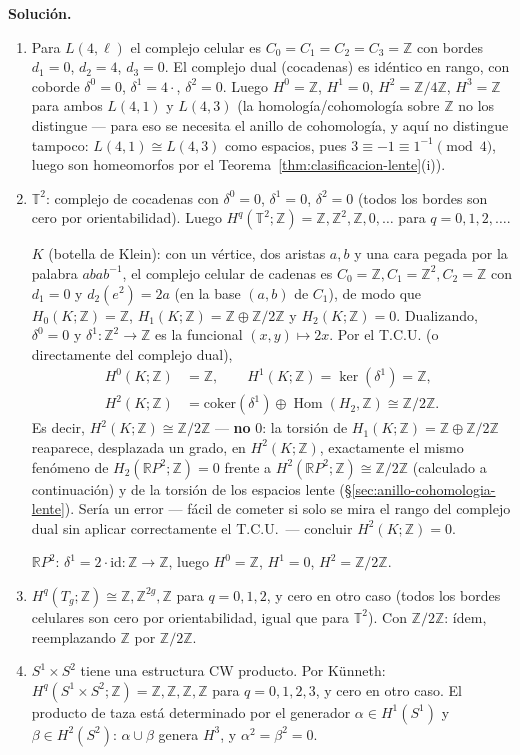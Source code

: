\documentclass[11pt,a4paper]{article}
\theoremstyle{plain}
\theoremstyle{definition}
\theoremstyle{remark}
\newcommand{\RR}{\mathbb R}
\newcommand{\ZZ}{\mathbb Z}
\DeclareMathOperator{\Hom}{Hom}
\begin{document}
\begin{enumerate}[label=\arabic*.,leftmargin=*]
\noindent\textbf{Solución.}
\begin{enumerate}[label=\alph*)]
\item Para $L(4,\ell)$ el complejo celular es $C_0=C_1=C_2=C_3=\ZZ$ con
bordes $d_1=0$, $d_2=4$, $d_3=0$. El complejo dual (cocadenas) es
idéntico en rango, con coborde $\delta^0=0$, $\delta^1=4\cdot$,
$\delta^2=0$. Luego $H^0=\ZZ$, $H^1=0$, $H^2=\ZZ/4\ZZ$, $H^3=\ZZ$ para
ambos $L(4,1)$ y $L(4,3)$ (la homología/cohomología sobre $\ZZ$ no los
distingue --- para eso se necesita el anillo de cohomología, y aquí no
distingue tampoco: $L(4,1)\cong L(4,3)$ como espacios, pues
$3\equiv-1\equiv1^{-1}\pmod4$, luego son homeomorfos por el
Teorema~\ref{thm:clasificacion-lente}(i)).
\item $\mathbb T^2$: complejo de cocadenas con $\delta^0=0$, $\delta^1=0$,
$\delta^2=0$ (todos los bordes son cero por orientabilidad). Luego
$H^q(\mathbb T^2;\ZZ)=\ZZ,\ZZ^2,\ZZ,0,\dots$ para $q=0,1,2,\dots$.

$K$ (botella de Klein): con un vértice, dos aristas $a,b$ y una cara pegada
por la palabra $abab^{-1}$, el complejo celular de cadenas es
$C_0=\ZZ,C_1=\ZZ^2,C_2=\ZZ$ con $d_1=0$ y $d_2(e^2)=2a$ (en la base
$(a,b)$ de $C_1$), de modo que $H_0(K;\ZZ)=\ZZ$, $H_1(K;\ZZ)=\ZZ\oplus\ZZ/2\ZZ$
y $H_2(K;\ZZ)=0$. Dualizando, $\delta^0=0$ y $\delta^1:\ZZ^2\to\ZZ$ es la
funcional $(x,y)\mapsto2x$. Por el T.C.U. (o directamente del complejo
dual),
\[
\begin{aligned}
H^0(K;\ZZ)&=\ZZ, \qquad H^1(K;\ZZ)=\ker(\delta^1)=\ZZ,\\
H^2(K;\ZZ)&=\mathrm{coker}(\delta^1)\oplus\Hom(H_2,\ZZ)\cong\ZZ/2\ZZ.
\end{aligned}
\]
Es decir, $H^2(K;\ZZ)\cong\ZZ/2\ZZ$ --- \textbf{no} $0$: la torsión de
$H_1(K;\ZZ)=\ZZ\oplus\ZZ/2\ZZ$ reaparece, desplazada un grado, en
$H^2(K;\ZZ)$, exactamente el mismo fenómeno de
$H_2(\RR P^2;\ZZ)=0$ frente a $H^2(\RR P^2;\ZZ)\cong\ZZ/2\ZZ$ (calculado a
continuación) y de la torsión de los espacios lente
(\S\ref{sec:anillo-cohomologia-lente}). Sería un error --- fácil de
cometer si solo se mira el rango del complejo dual sin aplicar
correctamente el T.C.U.\ --- concluir $H^2(K;\ZZ)=0$.

$\RR P^2$: $\delta^1=2\cdot\mathrm{id}:\ZZ\to\ZZ$, luego $H^0=\ZZ$,
$H^1=0$, $H^2=\ZZ/2\ZZ$.
\item $H^q(T_g;\ZZ)\cong\ZZ,\ZZ^{2g},\ZZ$ para $q=0,1,2$, y cero en otro
caso (todos los bordes celulares son cero por orientabilidad, igual que
para $\mathbb T^2$). Con $\ZZ/2\ZZ$: ídem, reemplazando $\ZZ$ por
$\ZZ/2\ZZ$.
\item $S^1\times S^2$ tiene una estructura CW producto. Por Künneth:
$H^q(S^1\times S^2;\ZZ)=\ZZ,\ZZ,\ZZ,\ZZ$ para $q=0,1,2,3$, y cero en otro
caso. El producto de taza está determinado por el generador
$\alpha\in H^1(S^1)$ y $\beta\in H^2(S^2)$: $\alpha\cup\beta$ genera
$H^3$, y $\alpha^2=\beta^2=0$.
\end{enumerate}


\end{enumerate}
\end{document}
